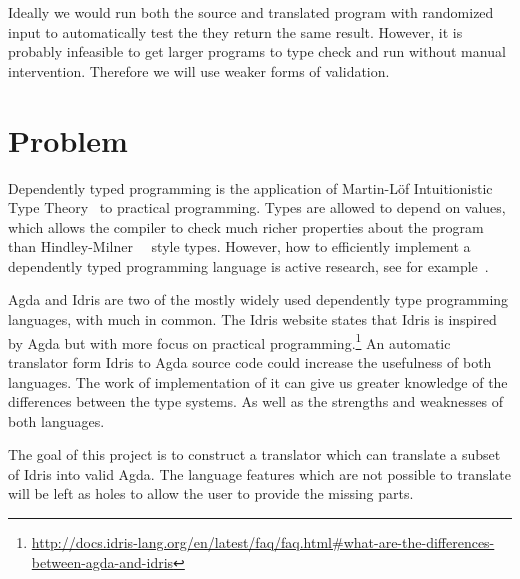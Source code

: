 \documentclass[parskip=half]{scrartcl}
\begin{document}
Ideally we would run both the source and translated program with randomized
input to automatically test the they return the same result. However, it is
probably infeasible to get larger programs to type check and run without manual
intervention.  Therefore we will use weaker forms of validation.

\section{Problem}

Dependently typed programming is the application of Martin-Löf
Intuitionistic Type Theory~\cite{martinlof} to practical programming.
Types are allowed to depend on values, which allows the compiler to check much
richer properties about the program than Hindley-Milner~\cite{hindley}~\cite{milner}
style types. However, how to efficiently implement a dependently typed
programming language is active research, see for
example~\cite{quantitative-type-theory}.

Agda and Idris are two of the mostly widely used dependently type programming
languages, with much in common. The Idris website states that Idris is inspired
by Agda but with more focus on practical
programming.\footnote{\url{http://docs.idris-lang.org/en/latest/faq/faq.html\#what-are-the-differences-between-agda-and-idris}}
An automatic translator form Idris to Agda source code could increase the
usefulness of both languages. The work of implementation of it can give us
greater knowledge of the differences between the type systems. As well as the
strengths and weaknesses of both languages.

The goal of this project is to construct a translator which can translate
a subset of Idris into valid Agda. The language features which are not possible
to translate will be left as holes to allow the user to provide the missing
parts.

\end{document}
